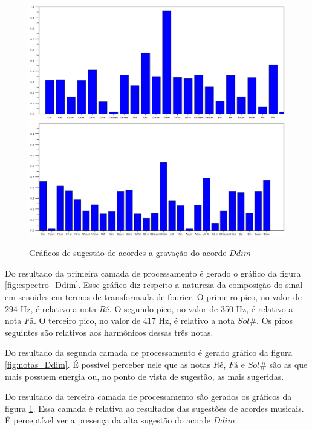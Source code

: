 \begin{figure}[h]
	\centering
		\includegraphics[keepaspectratio=true,scale=0.49]{figuras/Dm/acordes_1_Ddim.eps}
		\includegraphics[keepaspectratio=true,scale=0.49]{figuras/Dm/acordes_2_Ddim.eps}
	\caption{Gráficos de sugestão de acordes a gravação do acorde $Ddim$}
  \label{fig:acordes_Ddim}
\end{figure}
\newpage

Do resultado da primeira camada de processamento é gerado o gráfico da figura \ref{fig:espectro_Ddim}. Esse gráfico diz respeito a natureza da composição do sinal em senoides em termos de transformada de fourier. O primeiro pico, no valor de 294 Hz, é relativo a nota $Ré$. O segundo pico, no valor de 350 Hz, é relativo a nota $Fá$. O terceiro pico, no valor de 417 Hz, é relativo a nota $Sol\#$. Os picos seguintes são relativos aos harmônicos dessas três notas.

Do resultado da segunda camada de processamento é gerado gráfico da figura \ref{fig:notas_Ddim}. É possível perceber nele que as notas $Ré$, $Fá$ e $Sol\#$ são as que mais possuem energia ou, no ponto de vista de sugestão, as mais sugeridas.

Do resultado da terceira camada de processamento são gerados os gráficos da figura \ref{fig:acordes_Ddim}. Essa camada é relativa ao resultados das sugestões de acordes musicais. É perceptível ver a presença da alta sugestão do acorde $Ddim$.

